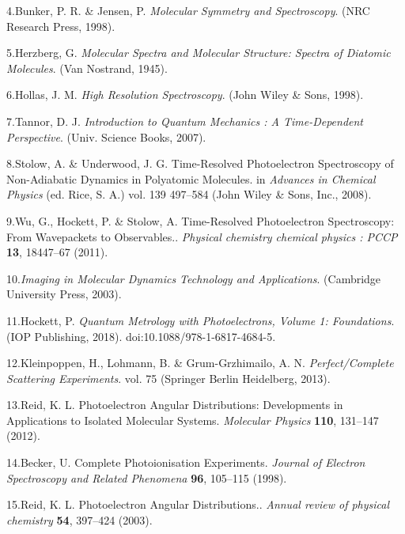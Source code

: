 \documentclass[10pt]{article}
\begin{document}
\label{csl:4}4.Bunker, P. R. \& Jensen, P. \textit{{Molecular {{Symmetry}} and {{Spectroscopy}}}}. ({NRC Research Press}, 1998).

\label{csl:5}5.Herzberg, G. \textit{{Molecular {{Spectra}} and {{Molecular Structure}}: {{Spectra}} of Diatomic Molecules}}. ({Van Nostrand}, 1945).

\label{csl:6}6.Hollas, J. M. \textit{{High {{Resolution Spectroscopy}}}}. ({John Wiley \& Sons}, 1998).

\label{csl:7}7.Tannor, D. J. \textit{{Introduction to Quantum Mechanics : A Time-Dependent Perspective}}. ({Univ. Science Books}, 2007).

\label{csl:8}8.Stolow, A. \& Underwood, J. G. {Time-{{Resolved Photoelectron Spectroscopy}} of {{Non}}-{{Adiabatic Dynamics}} in {{Polyatomic Molecules}}}. in \textit{Advances in {{Chemical Physics}}} (ed. Rice, S. A.) vol. 139 497–584 ({John Wiley \& Sons, Inc.}, 2008).

\label{csl:9}9.Wu, G., Hockett, P. \& Stolow, A. {Time-Resolved Photoelectron Spectroscopy: From Wavepackets to Observables.}. \textit{Physical chemistry chemical physics : PCCP} \textbf{13}, 18447–67 (2011).

\label{csl:10}10.\textit{{Imaging in {{Molecular Dynamics Technology}} and {{Applications}}}}. ({Cambridge University Press}, 2003).

\label{csl:11}11.Hockett, P. \textit{{Quantum {{Metrology}} with {{Photoelectrons}}, {{Volume}} 1: {{Foundations}}}}. ({IOP Publishing}, 2018). doi:10.1088/978-1-6817-4684-5.

\label{csl:12}12.Kleinpoppen, H., Lohmann, B. \& {Grum-Grzhimailo}, A. N. \textit{{Perfect/{{Complete Scattering Experiments}}}}. vol. 75 ({Springer Berlin Heidelberg}, 2013).

\label{csl:13}13.Reid, K. L. {Photoelectron Angular Distributions: Developments in Applications to Isolated Molecular Systems}. \textit{Molecular Physics} \textbf{110}, 131–147 (2012).

\label{csl:14}14.Becker, U. {Complete Photoionisation Experiments}. \textit{Journal of Electron Spectroscopy and Related Phenomena} \textbf{96}, 105–115 (1998).

\label{csl:15}15.Reid, K. L. {Photoelectron Angular Distributions.}. \textit{Annual review of physical chemistry} \textbf{54}, 397–424 (2003).
\end{document}
